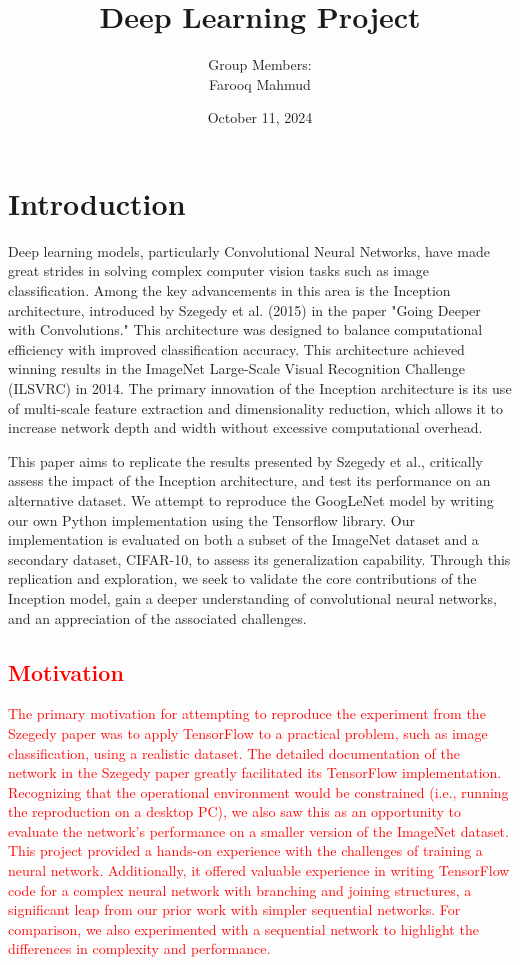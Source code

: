 \documentclass{article}
\title{Deep Learning Project}
\author{
    Group Members: \\
    Farooq Mahmud
}
\date{October 11, 2024}
\begin{document}
\maketitle

\section{Introduction}
Deep learning models, particularly Convolutional Neural Networks, have made great strides in solving complex computer vision tasks such as image classification. Among the key advancements in this area is the Inception architecture, introduced by Szegedy et al. (2015) in the paper "Going Deeper with Convolutions." This architecture was designed to balance computational efficiency with improved classification accuracy. This architecture achieved winning results in the ImageNet Large-Scale Visual Recognition Challenge (ILSVRC) in 2014. The primary innovation of the Inception architecture is its use of multi-scale feature extraction and dimensionality reduction, which allows it to increase network depth and width without excessive computational overhead\cite{szegedy2015going}.

This paper aims to replicate the results presented by Szegedy et al., critically assess the impact of the Inception architecture, and test its performance on an alternative dataset. We attempt to reproduce the GoogLeNet model by writing our own Python implementation using the Tensorflow library. Our implementation is evaluated on both a subset of the ImageNet dataset and a secondary dataset, CIFAR-10, to assess its generalization capability. Through this replication and exploration, we seek to validate the core contributions of the Inception model, gain a deeper understanding of convolutional neural networks, and an appreciation of the associated challenges.

\textcolor{red}{
\section {Motivation}
The primary motivation for attempting to reproduce the experiment from the Szegedy paper was to apply TensorFlow to a practical problem, such as image classification, using a realistic dataset. The detailed documentation of the network in the Szegedy paper greatly facilitated its TensorFlow implementation. Recognizing that the operational environment would be constrained (i.e., running the reproduction on a desktop PC), we also saw this as an opportunity to evaluate the network's performance on a smaller version of the ImageNet dataset. This project provided a hands-on experience with the challenges of training a neural network. Additionally, it offered valuable experience in writing TensorFlow code for a complex neural network with branching and joining structures, a significant leap from our prior work with simpler sequential networks. For comparison, we also experimented with a sequential network to highlight the differences in complexity and performance.}
\end{document}
